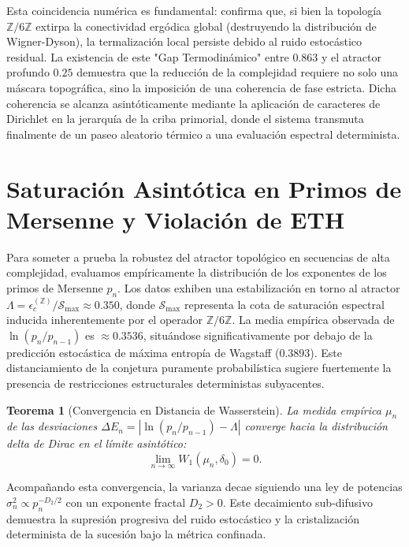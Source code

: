 \documentclass[sn-mathphys]{sn-jnl}
\newtheorem{theorem}{Teorema}[section]
\theoremstyle{definition} %
\newcommand{\Zmod}{\mathbb{Z}/6\mathbb{Z}}
\begin{document}
Esta coincidencia numérica es fundamental: confirma que, si bien la topología $\Zmod$ extirpa la conectividad ergódica global (destruyendo la distribución de Wigner-Dyson), la termalización local persiste debido al ruido estocástico residual. La existencia de este "Gap Termodinámico" entre $0.863$ y el atractor profundo $0.25$ demuestra que la reducción de la complejidad requiere no solo una máscara topográfica, sino la imposición de una coherencia de fase estricta. Dicha coherencia se alcanza asintóticamente mediante la aplicación de caracteres de Dirichlet en la jerarquía de la criba primorial, donde el sistema transmuta finalmente de un paseo aleatorio térmico a una evaluación espectral determinista.

\section{Saturación Asintótica en Primos de Mersenne y Violación de ETH}

Para someter a prueba la robustez del atractor topológico en secuencias de alta complejidad, evaluamos empíricamente la distribución de los exponentes de los primos de Mersenne $p_n$. Los datos exhiben una estabilización en torno al atractor $\Lambda = \epsilon_c^{(\mathbb{Z})}/\mathcal{S}_{\max} \approx 0.350$, donde $\mathcal{S}_{\max}$ representa la cota de saturación espectral inducida inherentemente por el operador $\Zmod$. La media empírica observada de $\ln(p_n/p_{n-1})$ es $\approx 0.3536$, situándose significativamente por debajo de la predicción estocástica de máxima entropía de Wagstaff ($0.3893$). Este distanciamiento de la conjetura puramente probabilística sugiere fuertemente la presencia de restricciones estructurales deterministas subyacentes.

\begin{theorem}[Convergencia en Distancia de Wasserstein]
La medida empírica $\mu_n$ de las desviaciones $\Delta E_n = |\ln(p_n/p_{n-1}) - \Lambda|$ converge hacia la distribución delta de Dirac en el límite asintótico:
\begin{equation}
    \lim_{n\to\infty} W_1(\mu_n, \delta_0) = 0.
\end{equation}
\end{theorem}
Acompañando esta convergencia, la varianza decae siguiendo una ley de potencias $\sigma_n^2 \propto p_n^{-D_2/2}$ con un exponente fractal $D_2>0$. Este decaimiento sub-difusivo demuestra la supresión progresiva del ruido estocástico y la cristalización determinista de la sucesión bajo la métrica confinada.
\end{document}
